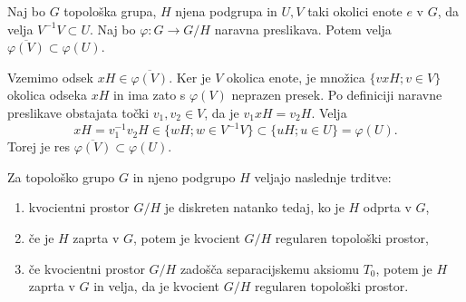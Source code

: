 \documentclass[mat1]{fmfdelo}
\newcommand{\closure}[1]{\overline{#1}}
\begin{document}
\begin{trditev}\label{trd:okolicevkvoc}
Naj bo $G$ topološka grupa, $H$ njena podgrupa in $U, V$ taki okolici enote $e$ v $G$, da velja $V^{-1}V \subset U$. Naj bo $\varphi: G \to G/H$ naravna preslikava. Potem velja $\closure{\varphi(V)} \subset \varphi(U)$.
\end{trditev}

\begin{dokaz}
Vzemimo odsek $xH \in \closure{\varphi(V)}$. Ker je $V$ okolica enote, je množica $\lbrace vxH ; v \in V \rbrace$ okolica odseka $xH$ in ima zato s $\varphi(V)$ neprazen presek. Po definiciji naravne preslikave obstajata točki $v_1, v_2 \in V$, da je $v_1xH = v_2H$. Velja \[xH = v_1^{-1}v_2H \in \lbrace wH ; w \in V^{-1}V \rbrace \subset \lbrace uH ; u \in U \rbrace = \varphi(U). \]
Torej je res $\closure{\varphi(V)} \subset \varphi(U)$.
\end{dokaz}

\begin{izrek}\label{izr:kvocreg}
Za topološko grupo $G$ in njeno podgrupo $H$ veljajo naslednje trditve:
\begin{enumerate}
\item kvocientni prostor $G/H$ je diskreten natanko tedaj, ko je $H$ odprta v $G$,\label{podtrd:kvocreg1}
\item če je $H$ zaprta v $G$, potem je kvocient $G/H$ regularen topološki prostor,\label{podtrd:kvocreg2}
\item če kvocientni prostor $G/H$ zadošča separacijskemu aksiomu $T_0$, potem je $H$ zaprta v $G$ in velja, da je kvocient $G/H$ regularen topološki prostor.\label{podtrd:kvocreg3}
\end{enumerate}
\end{izrek}
\end{document}
